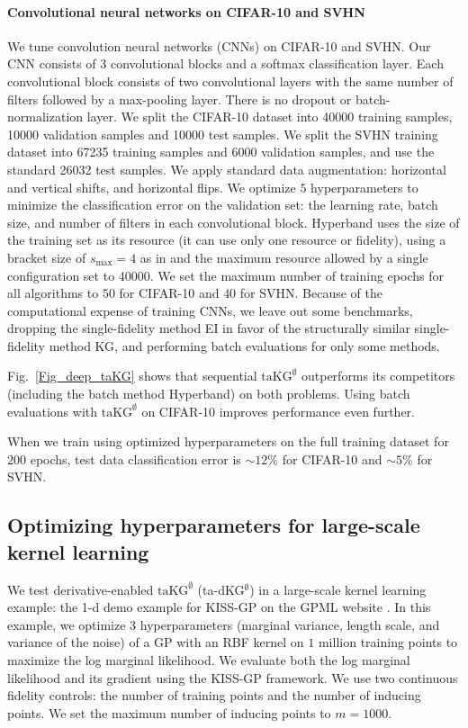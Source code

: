 \documentclass[letterpaper]{article}
\newcommand{\taKGE}{\text{taKG}^\emptyset}
\numberwithin{equation}{section}
\begin{document}
\paragraph{Convolutional neural networks on CIFAR-10 and SVHN}
\label{sect:cnns}
We tune convolution neural networks (CNNs) on CIFAR-10 and SVHN. Our CNN consists of 3 convolutional blocks and a softmax classification layer. Each convolutional block consists of two convolutional layers with the same number of filters followed by a max-pooling layer. There is no dropout or batch-normalization layer. We split the CIFAR-10 dataset into 40000 training samples, 10000 validation samples and 10000 test samples. We split the SVHN training dataset into 67235 training samples and 6000 validation samples, and use the standard 26032 test samples. We apply standard data augmentation: horizontal and vertical shifts, and horizontal flips. We optimize $5$ hyperparameters to minimize the classification error on the validation set: the learning rate, batch size, and number of filters in each convolutional block. Hyperband uses the size of the training set as its resource (it can use only one resource or fidelity), using a bracket size of $s_{\max} = 4$ as in \citet{li2016hyperband} and the maximum resource allowed by a single configuration set to 40000.
We set the maximum number of training epochs for all algorithms to $50$ for CIFAR-10 and $40$ for SVHN. 
Because of the computational expense of training CNNs, we leave out some benchmarks, dropping the single-fidelity method EI in favor of the structurally similar single-fidelity method KG, and performing batch evaluations for only some methods.

Fig.~\ref{Fig_deep_taKG} shows that sequential $\taKGE$ outperforms its competitors (including the batch method Hyperband) on both problems.  Using batch evaluations with $\taKGE$ on CIFAR-10 improves performance even further.

When we train using optimized hyperparameters on the full training dataset for $200$ epochs, test data classification error is $\sim12\%$ for CIFAR-10 and $\sim5\%$ for SVHN. 


\subsection{Optimizing hyperparameters for large-scale kernel learning}
\label{sect:kernel-learning}
We test derivative-enabled $\taKGE$ (ta-dKG$^\emptyset$) in a large-scale kernel learning example: the 1-d demo example for KISS-GP \citep{wilson2015kernel} on the GPML website \citep{gpml}.  In this example, we optimize 3 hyperparameters (marginal variance, length scale, and variance of the noise) of a GP with an RBF kernel on $1$ million training points to maximize the log marginal likelihood. We evaluate both the log marginal likelihood and its gradient using the KISS-GP framework. We use two continuous fidelity controls: the number of training points and the number of inducing points.  We set the maximum number of inducing points to $m=1000$.
\end{document}
